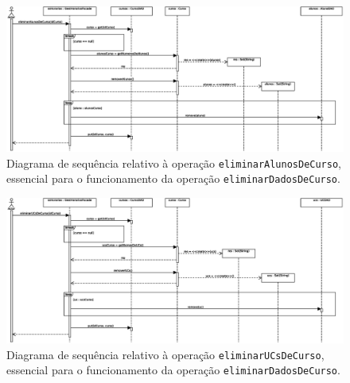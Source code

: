 \documentclass[12pt, a4paper]{article}
\begin{document}
\begin{landscape}
        \vspace*{\fill}
        \pagebreak
        \vspace*{\fill}

        \begin{figure}[H]
            \centering
            \includegraphics[scale=0.70]{Imagens/Modelos/eliminarAlunosDeCursoDAO.svg.eps}
            \caption{
                Diagrama de sequência relativo à operação \texttt{eliminarAlunosDeCurso}, essencial
                para o funcionamento da operação \texttt{eliminarDadosDeCurso}.
            }
        \end{figure}

        \vspace*{\fill}
        \pagebreak
        \vspace*{\fill}

        \begin{figure}[H]
            \centering
            \includegraphics[scale=0.70]{Imagens/Modelos/eliminarUCsDeCursoDAO.svg.eps}
            \caption{
                Diagrama de sequência relativo à operação \texttt{eliminarUCsDeCurso}, essencial
                para o funcionamento da operação \texttt{eliminarDadosDeCurso}.
            }
        \end{figure}

        \vspace*{\fill}
        \pagebreak
        \vspace*{\fill}


\end{landscape}
\end{document}
